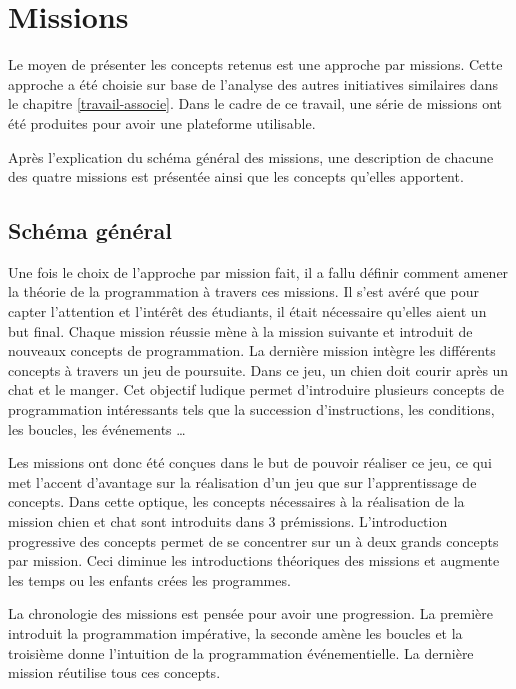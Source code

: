 \section{Missions}
\label{missions}
Le moyen de présenter les concepts retenus est une approche par \glspl{mission}. Cette approche a été choisie sur base de l'analyse des autres initiatives similaires dans le chapitre \ref{travail-associe}. Dans le cadre de ce travail, une série de \glspl{mission} ont été produites pour avoir une plateforme utilisable.

Après l'explication du schéma général des \glspl{mission}, une description de chacune des quatre \glspl{mission} est présentée ainsi que les concepts qu'elles apportent.

\subsection{Schéma général}
Une fois le choix de l'approche par mission fait, il a fallu définir comment amener la théorie de la programmation à travers ces \glspl{mission}. Il s'est avéré que pour capter l'attention et l'intérêt des étudiants, il était nécessaire qu'elles aient un but final. Chaque \gls{mission} réussie mène à la mission suivante et introduit de nouveaux concepts de programmation. La dernière mission intègre les différents concepts à travers un jeu de poursuite. Dans ce jeu, un chien doit courir après un chat et le manger. Cet objectif ludique permet d'introduire plusieurs concepts de programmation intéressants tels que la succession d'instructions, les conditions, les boucles, les événements \ldots

Les \glspl{mission} ont donc été conçues dans le but de pouvoir réaliser ce jeu, ce qui met l'accent d'avantage sur la réalisation d'un jeu que sur l'apprentissage de concepts. Dans cette optique, les concepts nécessaires à la réalisation de la \gls{mission} chien et chat sont introduits dans 3 prémissions. L'introduction progressive des concepts permet de se concentrer sur un à deux grands concepts par \gls{mission}. Ceci diminue les introductions théoriques des \glspl{mission} et augmente les temps ou les enfants crées les programmes.

La chronologie des \glspl{mission} est pensée pour avoir une progression. La première introduit la programmation impérative, la seconde amène les boucles et la troisième donne l'intuition de la programmation événementielle. La dernière \gls{mission} réutilise tous ces concepts.

